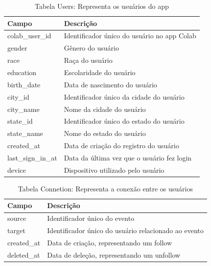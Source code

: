 \begin{table}[ht]
	\centering
	\caption{Tabela Users: Representa os usuários do app}
	\label{tab:user_model}
	\begin{tabularx}{\textwidth}{|l|X|}
		\hline
		\textbf{Campo}     & \textbf{Descrição}                              \\
		\hline
		colab\_user\_id    & Identificador único do usuário no app Colab 	 \\
		gender             & Gênero do usuário                               \\
		race               & Raça do usuário                               	 \\
		education          & Escolaridade do usuário                         \\
		birth\_date        & Data de nascimento do usuário                   \\
		city\_id           & Identificador único da cidade do usuário        \\
		city\_name         & Nome da cidade do usuário                       \\
		state\_id          & Identificador único do estado do usuário        \\
		state\_name        & Nome do estado do usuário                       \\
		created\_at        & Data de criação do registro do usuário          \\
		last\_sign\_in\_at & Data da última vez que o usuário fez login      \\
		device             & Dispositivo utilizado pelo usuário              \\
		\hline
	\end{tabularx}
\end{table}

\begin{table}[ht]
	\centering
	\caption{Tabela Connetion: Representa a conexão entre os usuários}
	\label{tab:connections_model}
	\begin{tabularx}{\textwidth}{|l|X|}
		\hline
		\textbf{Campo}    & \textbf{Descrição}                                   \\
		\hline
		source         	  & Identificador único do evento                        \\
		target            & Identificador único do usuário relacionado ao evento \\
		created\_at       & Data de criação, representando um follow             \\
		deleted\_at       & Data de deleção, representando um unfollow			 \\
		\hline
	\end{tabularx}
\end{table}

